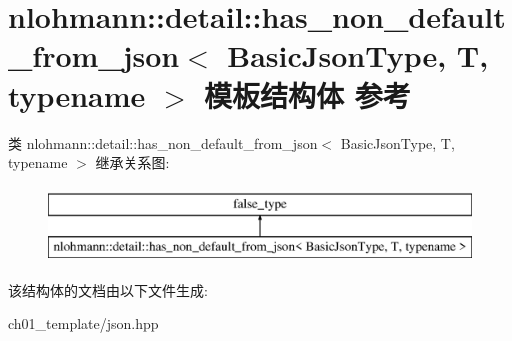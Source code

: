 \hypertarget{structnlohmann_1_1detail_1_1has__non__default__from__json}{}\section{nlohmann\+::detail\+::has\+\_\+non\+\_\+default\+\_\+from\+\_\+json$<$ Basic\+Json\+Type, T, typename $>$ 模板结构体 参考}
\label{structnlohmann_1_1detail_1_1has__non__default__from__json}
类 nlohmann\+::detail\+::has\+\_\+non\+\_\+default\+\_\+from\+\_\+json$<$ Basic\+Json\+Type, T, typename $>$ 继承关系图\+:\begin{figure}[H]
\begin{center}
\leavevmode
\includegraphics[height=2.000000cm]{structnlohmann_1_1detail_1_1has__non__default__from__json}
\end{center}
\end{figure}


该结构体的文档由以下文件生成\+:\begin{DoxyCompactItemize}
\item 
ch01\+\_\+template/json.\+hpp\end{DoxyCompactItemize}
